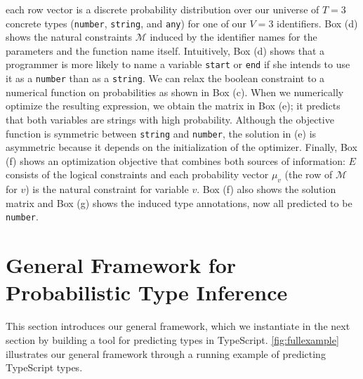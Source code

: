 \documentclass[sigplan,10pt,review,anonymous]{acmart} %
\theoremstyle{plain}
\theoremstyle{remark}
\theoremstyle{definition}
\begin{document}
\begin{figure*}
\begin{minipage}{\textwidth}
		each row vector is a discrete probability distribution
		over our universe of $T=3$ concrete types
		(\lstinline{number}, \lstinline{string}, and \lstinline{any})
		for one of our $V=3$ identifiers.
		Box (d) shows the natural constraints $\mathcal{M}$ induced by the identifier names
		for the parameters and the function name itself.
		Intuitively, Box (d) shows that a programmer
		is more likely to name a variable \lstinline{start} or \lstinline{end}
		if she intends to use it as a \lstinline{number} than as a \lstinline{string}.
		We can relax the boolean constraint
		to a numerical function on probabilities as shown in Box (c).
		When we numerically optimize the resulting expression,
		we obtain the matrix in Box (e);
		it predicts that both variables are strings with high probability.
		Although the objective function is symmetric
		between \lstinline{string} and \lstinline{number},
		the solution in (e) is asymmetric because it depends on the initialization
		of the optimizer.
		Finally, Box (f) shows an optimization objective that
		combines both sources of information:
		$E$ consists of the logical constraints
		and each probability vector $\mu_v$ (the row of $\mathcal{M}$ for $v$)
		is the natural constraint for variable $v$.
		Box (f) also shows the solution matrix and Box (g) shows the induced type annotations,
		now all predicted to be \lstinline{number}.
	\end{minipage}
	\caption{An overview of the three type inference procedures via a minimal example.}\label{fig:fullexample}
\end{figure*}

\section{General Framework for Probabilistic Type Inference} \label{sec:framework}
This section introduces our general framework,
which we instantiate in the next section by building a tool for
predicting types in TypeScript.
\cref{fig:fullexample} illustrates our general framework through a running example of predicting TypeScript types. 

%
\end{document}
